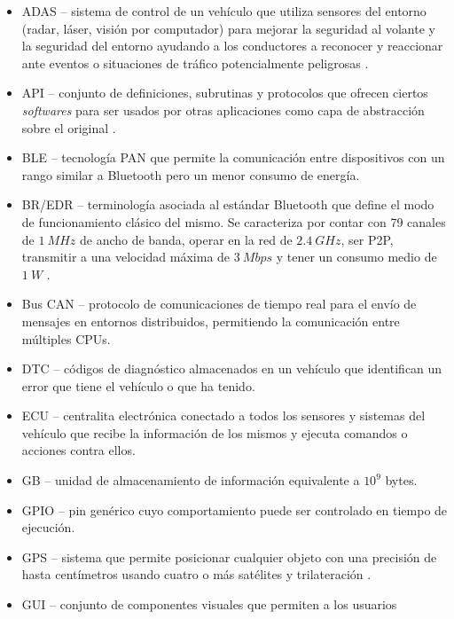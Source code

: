 \begin{itemize}
  \item \ac{ADAS} -- sistema de control de un vehículo que utiliza sensores del entorno
        (radar, láser, visión por computador) para mejorar la seguridad al volante y
        la seguridad del entorno ayudando a los conductores a reconocer y reaccionar
        ante eventos o situaciones de tráfico potencialmente peligrosas \cite{hermawanAcquisitionModelingEvaluating2020}.
  \item \ac{API} -- conjunto de definiciones, subrutinas y protocolos que ofrecen
        ciertos \textit{softwares} para ser usados por otras aplicaciones como
        capa de abstracción sobre el original \cite{InterfazProgramacionAplicaciones2021}.
  \item \ac{BLE} -- tecnología \ac{PAN} que permite la comunicación entre dispositivos
        con un rango similar a Bluetooth pero un menor consumo de energía.
  \item \ac{BR/EDR} -- terminología asociada al estándar Bluetooth que define el modo
        de funcionamiento clásico del mismo. Se caracteriza por contar con 79 canales
        de $1~MHz$ de ancho de banda, operar en la red de $2.4~GHz$, ser \ac{P2P},
        transmitir a una velocidad máxima de $3~Mbps$ y tener un consumo medio de
        $1~W$ \cite{ComparisonBluetoothBR}.
  \item Bus \ac{CAN} -- protocolo de comunicaciones de tiempo real para el envío de
        mensajes en entornos distribuidos, permitiendo la comunicación
        entre múltiples CPUs.
  \item \ac{DTC} -- códigos de diagnóstico almacenados en un vehículo que identifican
        un error que tiene el vehículo o que ha tenido.
  \item \ac{ECU} -- centralita electrónica conectado a todos los sensores y sistemas
        del vehículo que recibe la información de los mismos y ejecuta comandos o acciones
        contra ellos.
  \item \ac{GB} -- unidad de almacenamiento de información equivalente a $10^9$ bytes.
  \item \ac{GPIO} -- pin genérico cuyo comportamiento puede ser controlado en tiempo
        de ejecución.
  \item \ac{GPS} -- sistema que permite posicionar cualquier objeto con una 
        precisión de hasta centímetros usando cuatro o más satélites y 
        trilateración \cite{GPS2021}.
  \item \ac{GUI} -- conjunto de componentes visuales que permiten a los usuarios

\end{itemize}
